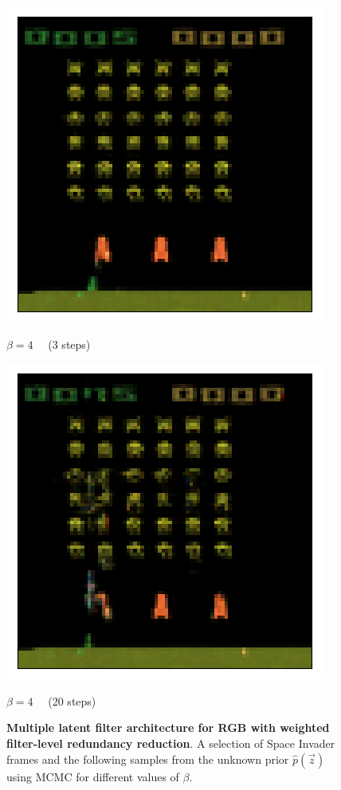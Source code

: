\begin{figure}[h!]
\begin{multicols}{4}
    \includegraphics[scale=0.4]{figures/results/colour_separated/beta_4_posterior_sample_4.png}
    \caption{$\beta=4\quad$ (3 steps)}
    \includegraphics[scale=0.4]{figures/results/colour_separated/beta_4_posterior_sample_20.png}
    \caption{$\beta=4\quad$ (20 steps)}
\end{multicols}

\caption{\textbf{Multiple latent filter architecture for RGB with weighted filter-level redundancy reduction}. A selection of Space Invader frames and the following samples from the unknown prior $\hat{p}(\vec{z})$ using MCMC for different values of $\beta$.}
\label{fig:colour_separated_posterior_samples}
\end{figure}


